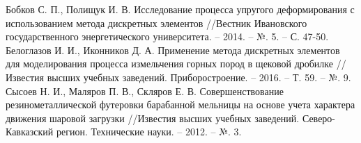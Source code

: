 \documentclass[utf8x, 14pt, oneside, a4paper]{article}
\begin{document}
\begin{thebibliography}{99}
 Бобков С. П., Полищук И. В. Исследование процесса упругого деформирования с использованием метода дискретных элементов //Вестник Ивановского государственного энергетического университета. – 2014. – №. 5. – С. 47-50.
 Белоглазов И. И., Иконников Д. А. Применение метода дискретных элементов для моделирования процесса измельчения горных пород в щековой дробилке //Известия высших учебных заведений. Приборостроение. – 2016. – Т. 59. – №. 9.
 Сысоев Н. И., Маляров П. В., Скляров Е. В. Совершенствование резинометаллической футеровки барабанной мельницы на основе учета характера движения шаровой загрузки //Известия высших учебных заведений. Северо-Кавказский регион. Технические науки. – 2012. – №. 3.

\end{thebibliography}
		\pagebreak
\end{document}
